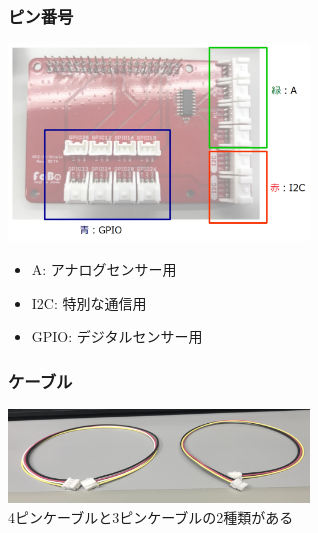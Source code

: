 \begin{frame}
    \frametitle{ピン番号}
    \begin{center}
        \includegraphics[width=0.6\textwidth]{images/chap05/text05-img012.png}
        \begin{itemize}
            \item A: アナログセンサー用
            \item I2C: 特別な通信用
            \item GPIO: デジタルセンサー用
        \end{itemize}
    \end{center}
\end{frame}

\begin{frame}
    \frametitle{ケーブル}
    \begin{center}
        \includegraphics[width=0.6\textwidth]{images/chap05/text05-img013.png}
        \vspace{3pt}
        {\\4ピンケーブルと3ピンケーブルの2種類がある}
    \end{center}
\end{frame}

